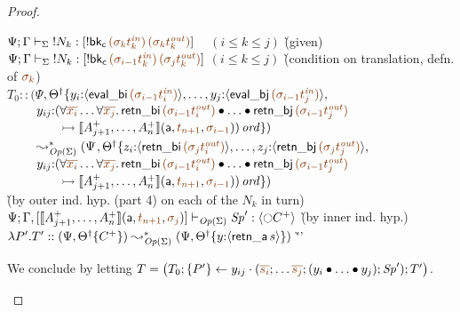 \begin{proof}
\begin{itemize}
  \begin{tabbing}
  $\slst{\Sigma}{\Psi}{\Gamma}{\tbangr{N_k}}{[{!}{{\sf bk_c}\,\lf{({\sigma_k}t_k^{\it in})}\,\lf{({\sigma_k}t_k^{\it out})}}]}$ ~ $(i \leq k \leq j)$
  \` (given) 
  \\
  $\slst{\Sigma}{\Psi}{\Gamma}{\tbangr{N_k}}{[{!}{{\sf bk_c}\,\lf{({\sigma_{i-1}}t_k^{\it in})}\,\lf{({\sigma_j}t_k^{\it out})}}]}$ $(i \leq k \leq j)$
  \` (condition on translation, defn. of $\lf{\sigma_k}$)
  \\
  $T_0 :: (\Psi$\=$, \opsubst{\Theta} \tackonstart
        y_i{:}\susp{{\sf eval\_bi}\,\lf{({\sigma_{i-1}}t^{\it in}_i)}}, \ldots,
    y_j{:}\susp{{\sf eval\_bj}\,\lf{({\sigma_{i-1}}t^{\it in}_j)}},$\\
  \>$~ \qquad y_{ij}{:}(\forall\lf{\overline{x_i}}\ldots\forall\lf{\overline{x_j}}.\, 
     {\sf retn\_bi}\,\lf{(\sigma_{i-1}{t^{\it out}_i})}
     \fuse \ldots \fuse 
     {\sf retn\_bj}\,\lf{(\sigma_{i-1}{t^{\it out}_j})}$\\
  \>$~ \qquad\qquad
      \lefti \opbasic{A^+_{j+1},\ldots,A^+_n}{t_{n+1}}{\sigma_{i-1}})\,\mtrue
       \tackonstop)$\\
  $~ \qquad \leadsto^*_{{\it Op}({\Sigma})} 
        (\Psi$\=$, \opsubst{\Theta} \tackonstart
        z_i{:}\susp{{\sf retn\_bi}\,\lf{({\sigma_{j}}t^{\it out}_i)}}, \ldots,
    z_j{:}\susp{{\sf retn\_bj}\,\lf{({\sigma_{j}}t^{\it out}_j)}},$\\
  \>$~ \qquad y_{ij}{:}(\forall\lf{\overline{x_i}}\ldots\forall\lf{\overline{x_j}}.\, 
     {\sf retn\_bi}\,\lf{(\sigma_{i-1}{t^{\it out}_i})}
     \fuse \ldots \fuse 
     {\sf retn\_bj}\,\lf{(\sigma_{i-1}{t^{\it out}_j})}$\\
  \>$~ \qquad\qquad
      \lefti \opbasic{A^+_{j+1},\ldots,A^+_n}{t_{n+1}}{\sigma_{i-1}})\,\mtrue
       \tackonstop)$\\
  \` (by outer ind. hyp. (part 4) on each of the $N_k$ in turn)
  \\
  $\slst{\transop{\Sigma}}{\Psi}
     {\Gamma,[\opbasic{A^+_{j+1},\ldots,A^+_n}{t_{n+1}}{\sigma_{j}}]}
     {\Sp'}{\susp{{\ocircle}C^+}}$  
  \` (by inner ind. hyp.)
  \\
  $\lambda P'.T' :: (\Psi, {{{\Theta}^\dag}}\{{C^+}\}) 
       \leadsto^*_{{\it Op}({\Sigma})}
        (\Psi, {{{\Theta}^\dag}}\{{y{:}\langle {{\sf retn\_a}\,s} \rangle}\})$ 
 \` ''\qquad\qquad~
  \end{tabbing}
  We  conclude  by letting $T = 
  \left(T_0; \tstep{P'}{y_{ij}}{(\lf{\overline{s_i}}; \ldots \lf{\overline{s_j}}; (\tfuser{y_i}{\tfuser{\ldots}{y_j}}); \Sp')}; T'\right)$.
  \bigskip


\end{itemize}
\end{proof}
